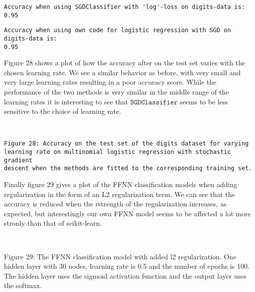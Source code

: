 \documentclass[11pt]{article}
\begin{document}
    \begin{Verbatim}[commandchars=\\\{\}]
Accuracy when using SGDClassifier with 'log'-loss on digits-data is: 0.95
    \end{Verbatim}

    \begin{Verbatim}[commandchars=\\\{\}]
Accuracy when using own code for logistic regression with SGD on digits-data is:
0.95
    \end{Verbatim}

    Figure 28 shows a plot of how the accuracy after on the test set
varies with the chosen learning rate. We see a similar behavior as
before, with very small and very large learning rates resulting in a
poor accuracy score. While the performance of the two methods is very
similar in the middle range of the learning rates it is interesting to
see that \(\texttt{SGDClassifier}\) seems to be less sensitive to the
choice of learning rate.


    \begin{center}
    \end{center}
    { \hspace*{\fill} \\}
 

    \begin{Verbatim}[commandchars=\\\{\}]
Figure 28: Accuracy on the test set of the digits dataset for varying
learning rate on multinomial logistic regression with stochastic gradient 
descent when the methods are fitted to the corresponding training set.
    \end{Verbatim}

Finally figure 29 gives a plot of the FFNN classification models when adding regularization in the form of an L2 regularization term. We can see that the accuracy is reduced when the rstrength of the regularization increases, as expected, but interestingly our own FFNN model seems to be affected a lot more stronly than that of scikit-learn.


    \begin{center}
    \end{center}
    { \hspace*{\fill} \\}
    
    Figure 29: The FFNN classification model with added l2
regularization. One hidden layer with 30 nodes, learning rate is 0.5 and
the number of epochs is 100. The hidden layer uses the sigmoid
activation function and the output layer uses the softmax.
\end{document}
